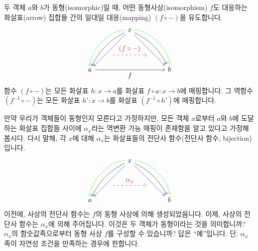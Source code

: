 \documentclass[DaoFP]{subfiles}
\begin{document}
\medskip

두 객체 $a$와 $b$가 동형(isomorphic)일 때, 어떤 동형사상(isomorphism) $f$도 대응하는 화살표(arrow) 집합들 간의 일대일 대응(mapping) $(f \circ -)$을 유도합니다.
\[
 \begin{tikzcd}
 \node(x) at (0, 2) {x};
 \node(a) at (-2, 0) {a};
 \node(b) at (2, 0) {b};
 \node(c1) at (-1, 1.5) {};
 \node(c2) at (-1.5, 1) {};
 \node(c3) at (-1, 2) {};
 \node(c4) at (-2, 1) {};
 \node(d1) at (1, 1.5) {};
 \node(d2) at (1.5, 1) {};
 \node(d3) at (1, 2) {};
 \node(d4) at (2, 1) {};
\node (aa) at (-1, 0.75) {};
 \node (bb) at (1, 0.75) {};
 \draw[->] (x) .. controls (c1)  and (c2) .. (a); %
 \draw[->, green] (x) .. controls (c3)  and (c4) .. (a); %
 \draw[->, blue] (x) -- (a); 
  \draw[->] (x) .. controls (d1)  and (d2) .. (b); %
 \draw[->, green] (x) .. controls (d3)  and (d4) .. (b); %
 \draw[->, blue] (x) -- (b); 
 \draw[->, red, dashed] (aa) -- node[above]{(f \circ -)} (bb);
\draw[->] (a) -- node[below]{f} (b);
 \end{tikzcd}
\]
함수 $(f \circ -)$는 모든 화살표 $h \colon x \to a$를 화살표 $f \circ a \colon x \to b$에 매핑합니다. 그 역함수 $(f^{-1} \circ -)$는 모든 화살표 $h' \colon x \to b$를 화살표 $(f^{-1} \circ h')$에 매핑합니다.


만약 우리가 객체들이 동형인지 모른다고 가정하지만, 모든 객체 $x$로부터 $a$와 $b$에 도달하는 화살표 집합들 사이에 $\alpha_x$라는 역변환 가능 매핑이 존재함을 알고 있다고 가정해 봅시다. 다시 말해, 각 $x$에 대해 $\alpha_x$는 화살표들의 전단사 함수(전단사 함수, bijection)입니다.
\[
 \begin{tikzcd}
 \node(x) at (0, 2) {x};
 \node(a) at (-2, 0) {a};
 \node(b) at (2, 0) {b};
 \node(c1) at (-1, 1.5) {};
 \node(c2) at (-1.5, 1) {};
 \node(c3) at (-1, 2) {};
 \node(c4) at (-2, 1) {};
 \node(d1) at (1, 1.5) {};
 \node(d2) at (1.5, 1) {};
 \node(d3) at (1, 2) {};
 \node(d4) at (2, 1) {};
\node (aa) at (-1, 0.75) {};
 \node (bb) at (1, 0.75) {};
 \draw[->] (x) .. controls (c1)  and (c2) .. (a); %
 \draw[->, green] (x) .. controls (c3)  and (c4) .. (a); %
 \draw[->, blue] (x) -- (a); 
  \draw[->] (x) .. controls (d1)  and (d2) .. (b); %
 \draw[->, green] (x) .. controls (d3)  and (d4) .. (b); %
 \draw[->, blue] (x) -- (b); 
 \draw[->, red, dashed] (aa) -- node[above]{\alpha_x} (bb);
 \end{tikzcd}
\]
이전에, 사상의 전단사 함수는 $f$의 동형 사상에 의해 생성되었음니다. 이제, 사상의 전단사 함수는 $\alpha_x$에 의해 주어집니다. 이것은 두 객체가 동형이라는 것을 의미합니까? $\alpha_x$의 함숫값족으로부터 동형 사상 $f$를 구성할 수 있습니까? 답은 ``예''입니다. 단, $\alpha_x$ 족이 자연성 조건을 만족하는 경우에 한합니다.
\end{document}
